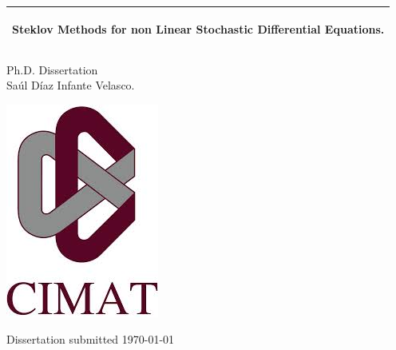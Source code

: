 %
\begin{titlepage}
	\addtolength{\hoffset}{0.5\evensidemargin-0.5\oddsidemargin}
	\noindent%
	\begin{tabular}{@{}p{\textwidth}@{}}
		\toprule[2pt]
		\midrule
		\vspace{0.2cm}
		\begin{center}
			\Huge{\textbf{
					Steklov Methods for non Linear Stochastic Differential Equations.
				}
			}
		\end{center}
		\vspace{0.2cm}\\
		\midrule
		\toprule[2pt]
	\end{tabular}
	\vspace{3 cm}
	\begin{center}
		{
			\large
				Ph.D. Dissertation%
		}\\
		\vspace{0.2cm}
		{
			\Large
			Sa\'ul D\'iaz Infante Velasco.
		}
		\end{center}
		\begin{center}
			\includegraphics{frontmatter/Logo}
		\end{center}

		\vfill
	\begin{center}
		Dissertation submitted \today
	\end{center}
	\end{titlepage}
	\clearpage
